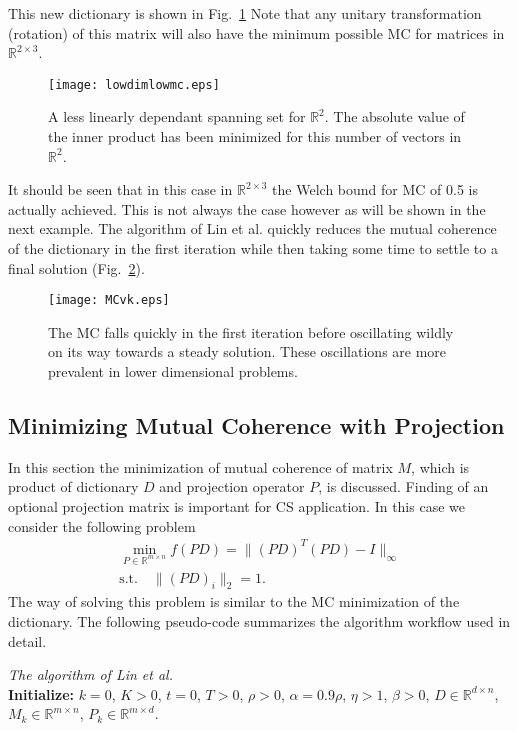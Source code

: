 \documentclass[journal]{IEEEtran}
\begin{document}
This new dictionary is shown in Fig.~\ref{Fig:lowdimlow}
Note that any unitary transformation (rotation) of this matrix will also have the minimum possible MC for
matrices in $\mathbb{R}^{2 \times 3}$.
\begin{figure}[!t]
\centering
\texttt{[image: lowdimlowmc.eps]}
\caption{A less linearly dependant spanning set for $\mathbb{R}^2$. The absolute value
of the inner product has been minimized for this number of vectors in $\mathbb{R}^2$.}
\label{Fig:lowdimlow}
\end{figure}
It should be seen that in this case in $\mathbb{R}^{2\times3}$ the Welch bound for MC of 0.5 is 
actually achieved. This is not always the case however as will be shown in the next example.
The algorithm of Lin et al. quickly reduces the mutual coherence of the dictionary in the first iteration while then taking some time to settle to a final solution (Fig.~\ref{Fig:mcvk}).
\begin{figure}[!t]
\centering
\texttt{[image: MCvk.eps]}
\caption{The MC falls quickly in the first iteration before oscillating wildly on its way towards a
steady solution. These oscillations are more prevalent in lower dimensional problems.}
\label{Fig:mcvk}
\end{figure}

\subsection{Minimizing Mutual Coherence with Projection}
In this section the minimization of mutual coherence of matrix $M$, which is product of dictionary $D$ and projection operator $P$, is discussed. Finding of an optional projection matrix is important for CS application. In this case we consider the following problem
\begin{align}
\min_{P\in\mathbb{R}^{m\times n}}f(PD)=\|(PD)^T(PD)-I\|_{\infty}\\
\textrm{s.t.}\quad\|(PD)_i\|_2=1.
\end{align}
The way of solving this problem is similar to the MC minimization of the dictionary. 
 The following pseudo-code summarizes the algorithm workflow used in detail.

\textit{The algorithm of Lin et al.}\\
\textbf{Initialize:} $k=0$, $K>0$, $t=0$, $T>0$, $\rho>0$,  $\alpha=0.9\rho$, $\eta>1$, $\beta>0$, $D\in\mathbb{R}^{d\times n}$, $M_k\in\mathbb{R}^{m\times n}$, $P_k\in\mathbb{R}^{m\times d}$.
\end{document}
